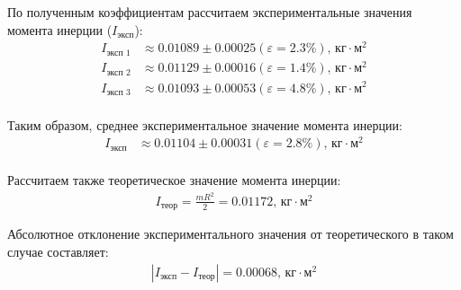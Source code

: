 \documentclass[12pt, a4paper]{article}
\begin{document}
По полученным коэффициентам рассчитаем экспериментальные значения момента инерции ($I_\text{эксп}$):
\begin{equation*}
\begin{aligned}
I_\text{эксп 1} &\approx 0.01089 \pm 0.00025 (\varepsilon=2.3\%) \text{, кг}\cdot\text{м}^2\\
I_\text{эксп 2} &\approx 0.01129 \pm 0.00016 (\varepsilon=1.4\%) \text{, кг}\cdot\text{м}^2\\
I_\text{эксп 3} &\approx 0.01093 \pm 0.00053 (\varepsilon=4.8\%) \text{, кг}\cdot\text{м}^2\\
\end{aligned}
\end{equation*}

Таким образом, среднее экспериментальное значение момента инерции:
\begin{equation*}
\begin{aligned}
I_\text{эксп} &\approx 0.01104 \pm 0.00031 (\varepsilon=2.8\%) \text{, кг}\cdot\text{м}^2\\
\end{aligned}
\end{equation*}

Рассчитаем также теоретическое значение момента инерции:
\begin{equation*}
\begin{aligned}
I_{\text{теор}} = \frac{mR^2}{2} = 0.01172 \text{, кг}\cdot\text{м}^2
\end{aligned}
\end{equation*}

Абсолютное отклонение экспериментального значения от теоретического в таком случае составляет:
\begin{equation*}
\begin{aligned}
\left| I_\text{эксп}-I_{\text{теор}}\right|  = 0.00068 \text{, кг}\cdot\text{м}^2
\end{aligned}
\end{equation*}

\newpage
\end{document}
